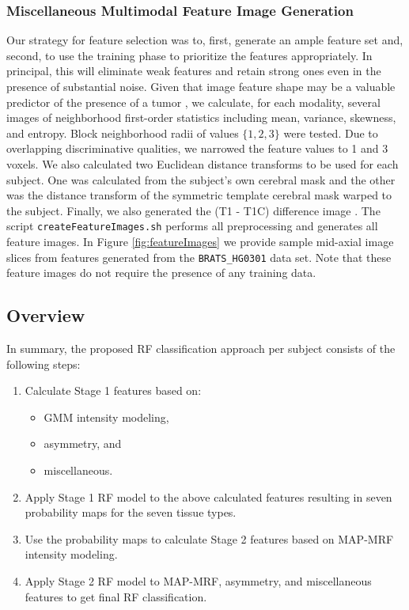 \documentclass[preprint,authoryear,review,12pt]{elsarticle}
\begin{document}
\subsubsection{Miscellaneous Multimodal Feature Image Generation}
\label{sec:misc}
Our strategy for feature selection was to, first, generate an ample feature
set and, second, to use the training phase to prioritize the features
appropriately.  In principal, this will eliminate weak features and
retain strong ones even in the presence of substantial noise.  Given
that image feature shape may be a valuable predictor of the presence of a
tumor \cite{zacharaki2009classification}, we calculate, for each modality, several images of neighborhood 
first-order statistics including mean, variance, skewness, and
entropy.  Block neighborhood radii of values $\{1,2,3\}$ were tested.
Due to overlapping discriminative qualities, we narrowed the feature
values to 1 and 3 voxels.  We also calculated two Euclidean distance
transforms \citep{maurer2003} to be used for each subject.  One was
calculated from the subject's own cerebral mask and the other was the 
distance transform of the symmetric template cerebral mask warped
to the subject.  Finally, we also generated the  (T1 - T1C) difference 
image \citep{prastawa2003}.
The script {\tt createFeatureImages.sh} performs all preprocessing
and generates all feature images.  In Figure \ref{fig:featureImages} we provide sample mid-axial 
image slices from features generated from the {\tt BRATS\_HG0301} data
set.  Note that these feature images do not require the presence of
any training data.

\subsection{Overview}

In summary, the proposed RF classification approach per subject consists of the 
following steps:

\begin{enumerate}
  \item Calculate Stage 1 features based on:  
  \begin{itemize}
    \item GMM intensity modeling,
    \item asymmetry, and
    \item miscellaneous.
  \end{itemize}
  \item Apply Stage 1 RF model to the above calculated features resulting in seven 
        probability maps for the seven tissue types.  
  \item Use the probability maps to calculate Stage 2 features based on MAP-MRF intensity modeling.
  \item Apply Stage 2 RF model to MAP-MRF, asymmetry, and miscellaneous features to 
  get final RF classification. 
\end{enumerate}
\end{document}
